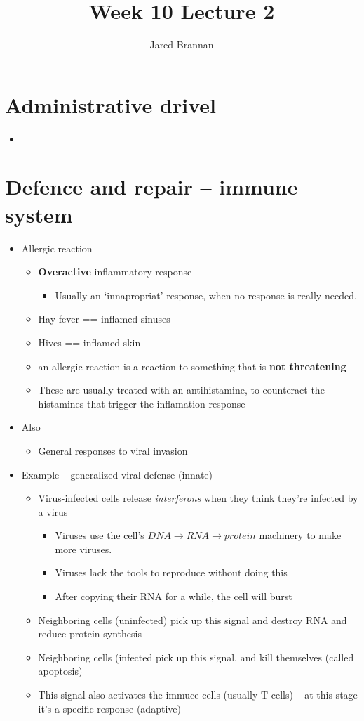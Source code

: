 \documentclass{article}
\title{Week 10 Lecture 2}
\author{Jared Brannan }
\theoremstyle{definition}
\begin{document}
\maketitle

\section{Administrative drivel}
\begin{itemize}
	\item
\end{itemize}

\section{Defence and repair -- immune system}
\begin{itemize}
	\item Allergic reaction
		\begin{itemize}
			\item \textbf{Overactive} inflammatory response
				\begin{itemize}
					\item Usually an `innapropriat' response, when no response is really needed.
				\end{itemize}
			\item Hay fever == inflamed sinuses
			\item Hives == inflamed skin
			\item an allergic reaction is a reaction to something that is \textbf{not threatening} 
			\item These are usually treated with an antihistamine, to counteract the histamines that trigger the inflamation response
		\end{itemize}
	\item Also
		\begin{itemize}
			\item General responses to viral invasion
		\end{itemize}
	\item Example -- generalized viral defense (innate)
		\begin{itemize}
			\item Virus-infected cells release \textit{interferons} when they think they're infected by a virus
				\begin{itemize}
					\item Viruses use the cell's $DNA\to RNA\to protein$ machinery to make more viruses.
					\item Viruses lack the tools to reproduce without doing this
					\item After copying their RNA for a while, the cell will burst
				\end{itemize}
			\item Neighboring cells (uninfected) pick up this signal and destroy RNA and reduce protein synthesis
			\item Neighboring cells (infected pick up this signal, and kill themselves (called apoptosis)
			\item This signal also activates the immuce cells (usually T cells) -- at this stage it's a specific response (adaptive)
		\end{itemize}
\end{itemize}
\end{document}
